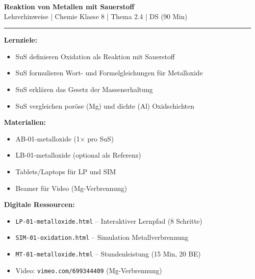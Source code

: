 \documentclass[11pt, a4paper]{article}
\newcommand{\abschnitt}[1]{%
    \vspace{10pt}%
    \noindent{\large\bfseries\textcolor{fachfarbe}{#1}}%
    \vspace{6pt}%
    \nopagebreak[4]%
}
\begin{document}

\begin{center}
    {\Large\bfseries\textcolor{fachfarbe}{Reaktion von Metallen mit Sauerstoff}}\\[0.3em]
    {\normalsize Lehrerhinweise | Chemie Klasse 8 | Thema 2.4 | DS (90 Min)}
\end{center}
\vspace{-0.3em}
\hrule
\vspace{0.8em}


\abschnitt{Überblick}

\begin{infobox}
\textbf{Lernziele:}
\begin{itemize}[leftmargin=1.5em, itemsep=0pt]
    \item SuS definieren Oxidation als Reaktion mit Sauerstoff
    \item SuS formulieren Wort- und Formelgleichungen für Metalloxide
    \item SuS erklären das Gesetz der Massenerhaltung
    \item SuS vergleichen poröse (Mg) und dichte (Al) Oxidschichten
\end{itemize}
\end{infobox}

\textbf{Materialien:}
\begin{itemize}[leftmargin=1.5em, itemsep=0pt]
    \item AB-01-metalloxide (1× pro SuS)
    \item LB-01-metalloxide (optional als Referenz)
    \item Tablets/Laptops für LP und SIM
    \item Beamer für Video (Mg-Verbrennung)
\end{itemize}

\textbf{Digitale Ressourcen:}
\begin{itemize}[leftmargin=1.5em, itemsep=0pt]
    \item \texttt{LP-01-metalloxide.html} -- Interaktiver Lernpfad (8 Schritte)
    \item \texttt{SIM-01-oxidation.html} -- Simulation Metallverbrennung
    \item \texttt{MT-01-metalloxide.html} -- Stundenleistung (15 Min, 20 BE)
    \item Video: \texttt{vimeo.com/699344409} (Mg-Verbrennung)
\end{itemize}
\end{document}
